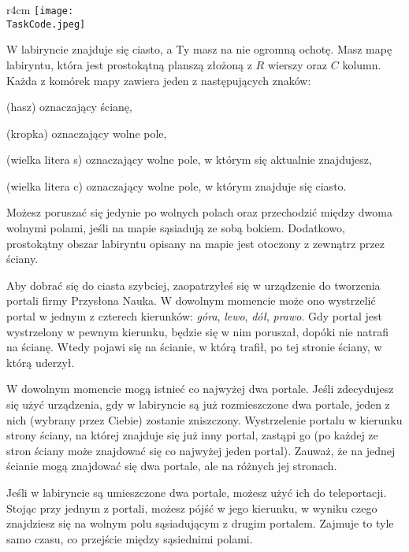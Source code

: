 \documentclass{boi2014-pl}
\renewcommand{\TaskCode}{portals}
\newcommand{\constant}[1]{{\tt #1}}
\begin{document}
    \begin{wrapfigure}[4]{r}{4cm}
        \vspace{-24pt}
		\texttt{[image: \\TaskCode.jpeg]}
	\end{wrapfigure}

    W labiryncie znajduje się ciasto, a Ty masz na nie ogromną ochotę.
    Masz mapę labiryntu, która jest prostokątną planszą złożoną z $R$ wierszy oraz $C$ kolumn.
    Każda z komórek mapy zawiera jeden z następujących znaków:
    \begin{description}[itemindent=1pt]
    	\item[\constant{\#}] (hasz) oznaczający ścianę,
        \item[\constant{.}] (kropka) oznaczający wolne pole,
        \item[\constant{S}] (wielka litera s) oznaczający wolne pole, w którym się aktualnie znajdujesz,
        \item[\constant{C}] (wielka litera c) oznaczający wolne pole, w którym znajduje się ciasto.
    \end{description}

    Możesz poruszać się jedynie po wolnych polach oraz przechodzić między dwoma wolnymi polami,
    jeśli na mapie sąsiadują ze sobą bokiem.
    Dodatkowo, prostokątny obszar labiryntu opisany na mapie jest otoczony z zewnątrz przez ściany.

    Aby dobrać się do ciasta szybciej, zaopatrzyłeś się w urządzenie do tworzenia portali firmy
    Przysłona Nauka\texttrademark{}.
    W dowolnym momencie może ono wystrzelić portal w jednym z czterech kierunków: \emph{góra}, \emph{lewo}, \emph{dół}, \emph{prawo}.
    Gdy portal jest wystrzelony w pewnym kierunku, będzie się w nim poruszał, dopóki nie natrafi na ścianę.
    Wtedy pojawi się na ścianie, w którą trafił, po tej stronie ściany, w którą uderzył.
    
    W dowolnym momencie mogą istnieć co najwyżej dwa portale.
    Jeśli zdecydujesz się użyć urządzenia, gdy w labiryncie są już rozmieszczone dwa portale, jeden z nich (wybrany przez Ciebie) zostanie zniszczony.
    Wystrzelenie portalu w kierunku strony ściany, na której znajduje się już inny portal, zastąpi go (po każdej ze stron ściany może znajdować się co najwyżej jeden portal).
    Zauważ, że na jednej ścianie mogą znajdować się dwa portale, ale na różnych jej stronach.

    Jeśli w labiryncie są umieszczone dwa portale, możesz użyć ich do teleportacji.
    Stojąc przy jednym z portali, możesz pójść w jego kierunku, w wyniku czego znajdziesz się na wolnym polu sąsiadującym z drugim portalem.
    Zajmuje to tyle samo czasu, co przejście między sąsiednimi polami.
\end{document}
